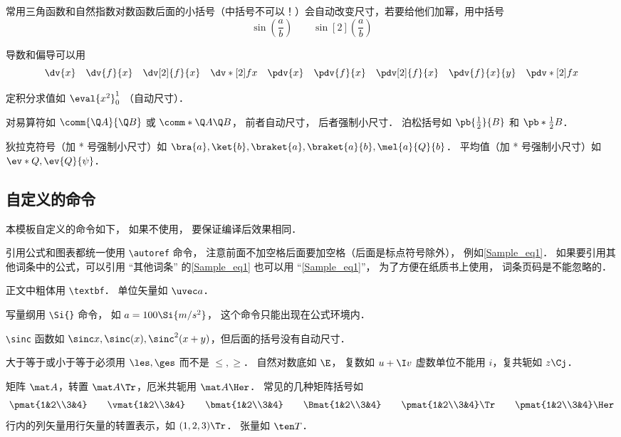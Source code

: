 常用三角函数和自然指数对数函数后面的小括号（中括号不可以！）会自动改变尺寸，若要给他们加幂，用中括号
\begin{equation}
\sin(\frac ab) \qquad \sin[2](\frac ab)
\end{equation}

导数和偏导可以用
\begin{equation}
\dv{x} \quad \dv{f}{x} \quad \dv[2]{f}{x} \quad \dv*[2]{f}{x} \quad
\pdv{x} \quad \pdv{f}{x} \quad \pdv[2]{f}{x} \quad \pdv{f}{x}{y} \quad \pdv*[2]{f}{x}
\end{equation}

定积分求值如 $\eval{x^2}_0^1$ （自动尺寸）．

对易算符如 $\comm{\Q A}{\Q B}$ 或 $\comm*{\Q A}{\Q B}$， 前者自动尺寸， 后者强制小尺寸． 泊松括号如 $\pb{\frac12}{B}$ 和 $\pb*{\frac12}{B}$．

狄拉克符号（加 * 号强制小尺寸）如 $\bra{a}, \ket{b}, \braket{a}, \braket{a}{b}, \mel{a}{Q}{b}$． 平均值（加 * 号强制小尺寸）如 $\ev*{Q}, \ev{Q}{\psi}$．

\subsection{自定义的命令}
本模板自定义的命令如下， 如果不使用， 要保证编译后效果相同．

引用公式和图表都统一使用 \lstinline|\autoref| 命令， 注意前面不加空格后面要加空格（后面是标点符号除外）， 例如\autoref{Sample_eq1}． 如果要引用其他词条中的公式，可以引用 “其他词条” 的\autoref{Sample_eq1} 也可以用 “\autoref{Sample_eq1}”， 为了方便在纸质书上使用， 词条页码是不能忽略的．

正文中粗体用 \lstinline|\textbf|． 单位矢量如 $\uvec a$．

写量纲用 \lstinline|\Si{}| 命令， 如 $a = 100\Si{m/s^2}$， 这个命令只能出现在公式环境内．

 \lstinline|\sinc| 函数如 $\sinc x, \sinc(x), \sinc^2(x+y)$，但后面的括号没有自动尺寸．
 
 大于等于或小于等于必须用 $\les, \ges$ 而不是 $\le, \ge$． 自然对数底如 $\E$， 复数如 $u+\I v$ 虚数单位不能用 $i$，复共轭如 $z\Cj$．
 
 矩阵 $\mat A$，转置 $\mat A \Tr$，厄米共轭用 $\mat A \Her$． 常见的几种矩阵括号如
\begin{equation}
\pmat{1&2\\3&4} \qquad
\vmat{1&2\\3&4} \qquad 
\bmat{1&2\\3&4} \qquad
\Bmat{1&2\\3&4} \qquad
\pmat{1&2\\3&4}\Tr \qquad
\pmat{1&2\\3&4}\Her
\end{equation}
行内的列矢量用行矢量的转置表示，如 $(1,2,3)\Tr$． 张量如 $\ten T$．

